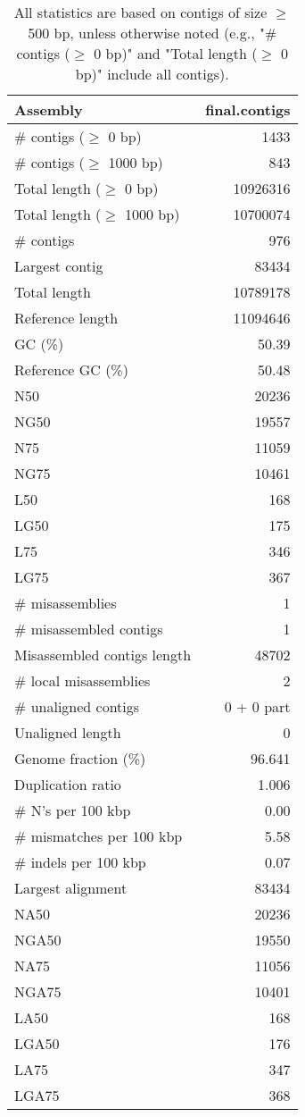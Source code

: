 \documentclass[12pt,a4paper]{article}
\begin{document}
\begin{table}[ht]
\begin{center}
\caption{All statistics are based on contigs of size $\geq$ 500 bp, unless otherwise noted (e.g., "\# contigs ($\geq$ 0 bp)" and "Total length ($\geq$ 0 bp)" include all contigs).}
\begin{tabular}{|l*{1}{|r}|}
\hline
Assembly & final.contigs \\ \hline
\# contigs ($\geq$ 0 bp) & 1433 \\ \hline
\# contigs ($\geq$ 1000 bp) & 843 \\ \hline
Total length ($\geq$ 0 bp) & 10926316 \\ \hline
Total length ($\geq$ 1000 bp) & 10700074 \\ \hline
\# contigs & 976 \\ \hline
Largest contig & 83434 \\ \hline
Total length & 10789178 \\ \hline
Reference length & 11094646 \\ \hline
GC (\%) & 50.39 \\ \hline
Reference GC (\%) & 50.48 \\ \hline
N50 & 20236 \\ \hline
NG50 & 19557 \\ \hline
N75 & 11059 \\ \hline
NG75 & 10461 \\ \hline
L50 & 168 \\ \hline
LG50 & 175 \\ \hline
L75 & 346 \\ \hline
LG75 & 367 \\ \hline
\# misassemblies & 1 \\ \hline
\# misassembled contigs & 1 \\ \hline
Misassembled contigs length & 48702 \\ \hline
\# local misassemblies & 2 \\ \hline
\# unaligned contigs & 0 + 0 part \\ \hline
Unaligned length & 0 \\ \hline
Genome fraction (\%) & 96.641 \\ \hline
Duplication ratio & 1.006 \\ \hline
\# N's per 100 kbp & 0.00 \\ \hline
\# mismatches per 100 kbp & 5.58 \\ \hline
\# indels per 100 kbp & 0.07 \\ \hline
Largest alignment & 83434 \\ \hline
NA50 & 20236 \\ \hline
NGA50 & 19550 \\ \hline
NA75 & 11056 \\ \hline
NGA75 & 10401 \\ \hline
LA50 & 168 \\ \hline
LGA50 & 176 \\ \hline
LA75 & 347 \\ \hline
LGA75 & 368 \\ \hline
\end{tabular}
\end{center}
\end{table}
\end{document}
